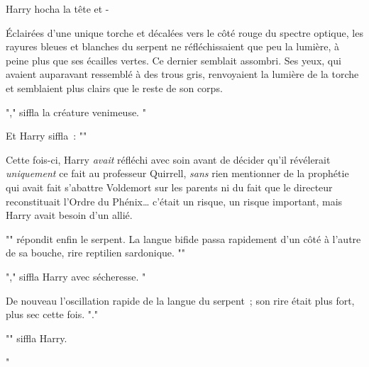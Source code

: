 Harry hocha la tête et -

Éclairées d'une unique torche et décalées vers le côté rouge du spectre optique, les rayures bleues et blanches du serpent ne réfléchissaient que peu la lumière, à peine plus que ses écailles vertes. Ce dernier semblait assombri. Ses yeux, qui avaient auparavant ressemblé à des trous gris, renvoyaient la lumière de la torche et semblaient plus clairs que le reste de son corps.

"," siffla la créature venimeuse. "

Et Harry siffla~: ""

Cette fois-ci, Harry \emph{avait} réfléchi avec soin avant de décider qu'il révélerait \emph{uniquement} ce fait au professeur Quirrell, \emph{sans} rien mentionner de la prophétie qui avait fait s'abattre Voldemort sur les parents ni du fait que le directeur reconstituait l'Ordre du Phénix… c'était un risque, un risque important, mais Harry avait besoin d'un allié.

"" répondit enfin le serpent. La langue bifide passa rapidement d'un côté à l'autre de sa bouche, rire reptilien sardonique. ""

"," siffla Harry avec sécheresse. "

De nouveau l'oscillation rapide de la langue du serpent~; son rire était plus fort, plus sec cette fois. "."

"" siffla Harry.

"


